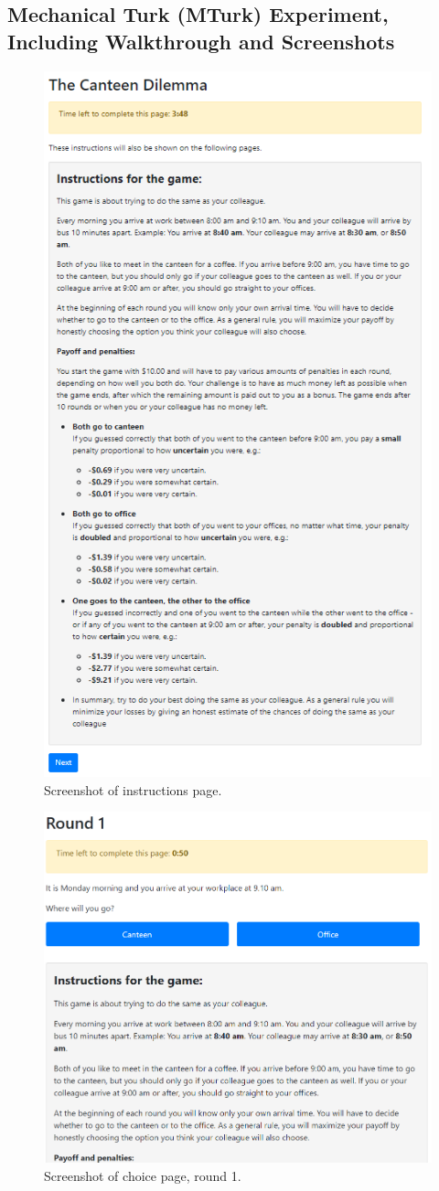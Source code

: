 \documentclass[a4paper,superscriptaddress,nofootinbib]{revtex4}
\begin{document}
\subsection{Mechanical Turk (MTurk) Experiment, Including Walkthrough and Screenshots}
\begin{figure} %
\centering\includegraphics[width=0.8\linewidth]{screenshot_instructions}
\caption{Screenshot of instructions page.}
\label{fig:instructions}
\end{figure}
\begin{figure} %
\centering\includegraphics[width=0.8\linewidth]{screenshot_round1}
\caption{Screenshot of choice page, round 1.}
\label{fig:round1}
\end{figure}
\end{document}
